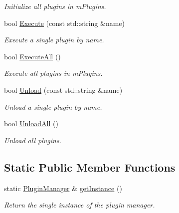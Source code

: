 \begin{DoxyCompactItemize}
\begin{DoxyCompactList}\small\item\em Initialize all plugins in m\+Plugins. \end{DoxyCompactList}\item 
\mbox{\label{class_plugin_manager_ab7ac61ad5e567af6ed38574cb89e80e6}} 
bool \hyperlink{class_plugin_manager_ab7ac61ad5e567af6ed38574cb89e80e6}{Execute} (const std\+::string \&name)
\begin{DoxyCompactList}\small\item\em Execute a single plugin by name. \end{DoxyCompactList}\item 
\mbox{\label{class_plugin_manager_ad2c750b62404561213e397066b852abb}} 
bool \hyperlink{class_plugin_manager_ad2c750b62404561213e397066b852abb}{Execute\+All} ()
\begin{DoxyCompactList}\small\item\em Execute all plugins in m\+Plugins. \end{DoxyCompactList}\item 
\mbox{\label{class_plugin_manager_ab651a05d6fcb92562807e9f5ecc30855}} 
bool \hyperlink{class_plugin_manager_ab651a05d6fcb92562807e9f5ecc30855}{Unload} (const std\+::string \&name)
\begin{DoxyCompactList}\small\item\em Unload a single plugin by name. \end{DoxyCompactList}\item 
\mbox{\label{class_plugin_manager_ac771065cfdf4032cfb254d2ae2cb0c0f}} 
bool \hyperlink{class_plugin_manager_ac771065cfdf4032cfb254d2ae2cb0c0f}{Unload\+All} ()
\begin{DoxyCompactList}\small\item\em Unload all plugins. \end{DoxyCompactList}\end{DoxyCompactItemize}
\subsection*{Static Public Member Functions}
\begin{DoxyCompactItemize}
\item 
\mbox{\label{class_plugin_manager_acc7641f5801a2df305dc71e1e87fc25b}} 
static \hyperlink{class_plugin_manager}{Plugin\+Manager} \& \hyperlink{class_plugin_manager_acc7641f5801a2df305dc71e1e87fc25b}{get\+Instance} ()
\begin{DoxyCompactList}\small\item\em Return the single instance of the plugin manager. \end{DoxyCompactList}\end{DoxyCompactItemize}


